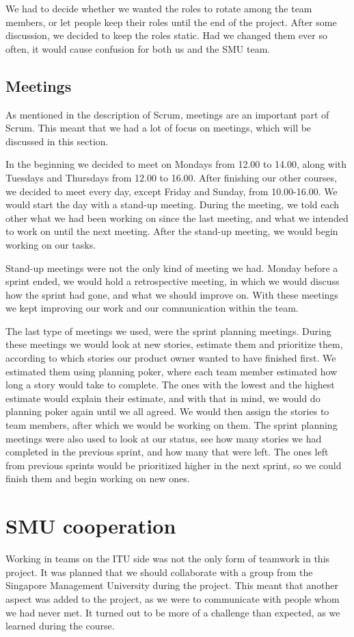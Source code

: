 We had to decide whether we wanted the roles to rotate among the team members, or let people keep their roles until the end of the project. After some discussion, we decided to keep the roles static. Had we changed them ever so often, it would cause confusion for both us and the SMU team.

\subsection{Meetings}
\label{Collaboration_ITU_Meetings}
As mentioned in the description of Scrum, meetings are an important part of Scrum. This meant that we had a lot of focus on meetings, which will be discussed in this section.

In the beginning we decided to meet on Mondays from 12.00 to 14.00, along with Tuesdays and Thursdays from 12.00 to 16.00. After finishing our other courses, we decided to meet every day, except Friday and Sunday, from 10.00-16.00. We would start the day with a stand-up meeting. During the meeting, we told each other what we had been working on since the last meeting, and what we intended to work on until the next meeting. After the stand-up meeting, we would begin working on our tasks.

Stand-up meetings were not the only kind of meeting we had. Monday before a sprint ended, we would hold a retrospective meeting, in which we would discuss how the sprint had gone, and what we should improve on. With these meetings we kept improving our work and our communication within the team.

The last type of meetings we used, were the sprint planning meetings. During these meetings we would look at new stories, estimate them and prioritize them, according to which stories our product owner wanted to have finished first. We estimated them using planning poker, where each team member estimated how long a story would take to complete. The ones with the lowest and the highest estimate would explain their estimate, and with that in mind, we would do planning poker again until we all agreed. We would then assign the stories to team members, after which we would be working on them. The sprint planning meetings were also used to look at our status, see how many stories we had completed in the previous sprint, and how many that were left. The ones left from previous sprints would be prioritized higher in the next sprint, so we could finish them and begin working on new ones.

\section{SMU cooperation}
\label{Collaboration_SMU}
Working in teams on the ITU side was not the only form of teamwork in this project. It was planned that we should collaborate with a group from the Singapore Management University during the project. This meant that another aspect was added to the project, as we were to communicate with people whom we had never met. It turned out to be more of a challenge than expected, as we learned during the course.

